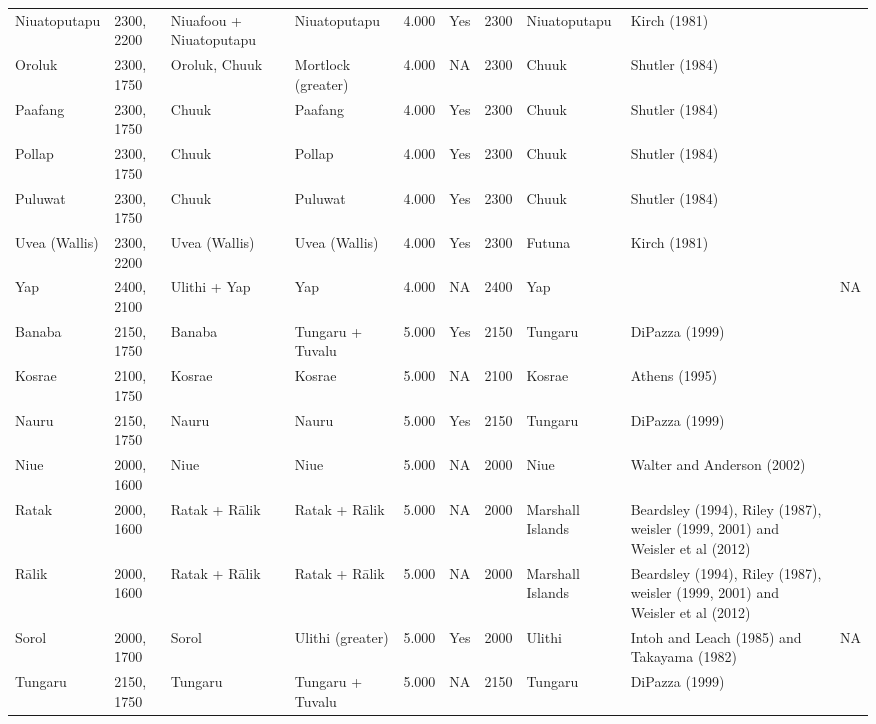 \begin{longtable}{p{4.5cm}p{2cm}p{2cm}p{2cm}p{4cm}p{4cm}p{4cm}p{4cm}p{4cm}p{4cm}}
  Niuatoputapu & 2300, 2200 & Niuafoou + Niuatoputapu & Niuatoputapu & 4.000 & Yes & 2300 & Niuatoputapu & Kirch (1981) & \citet{rieth_cochrane_2018} \\ 
  Oroluk & 2300, 1750 & Oroluk, Chuuk & Mortlock (greater) & 4.000 & NA & 2300 & Chuuk & Shutler (1984) & \citet{rieth_cochrane_2018} \\ 
  Paafang & 2300, 1750 & Chuuk & Paafang & 4.000 & Yes & 2300 & Chuuk & Shutler (1984) & \citet{rieth_cochrane_2018} \\ 
  Pollap & 2300, 1750 & Chuuk & Pollap & 4.000 & Yes & 2300 & Chuuk & Shutler (1984) & \citet{rieth_cochrane_2018} \\ 
  Puluwat & 2300, 1750 & Chuuk & Puluwat & 4.000 & Yes & 2300 & Chuuk & Shutler (1984) & \citet{rieth_cochrane_2018} \\ 
  Uvea (Wallis) & 2300, 2200 & Uvea (Wallis) & Uvea (Wallis) & 4.000 & Yes & 2300 & Futuna & Kirch (1981) & \citet{rieth_cochrane_2018} \\ 
  Yap & 2400, 2100 & Ulithi + Yap & Yap & 4.000 & NA & 2400 & Yap & \citet{Napolitano_et_al_yap} & NA \\ 
  Banaba & 2150, 1750 & Banaba & Tungaru + Tuvalu & 5.000 & Yes & 2150 & Tungaru & DiPazza (1999) & \citet{rieth_cochrane_2018} \\ 
  Kosrae & 2100, 1750 & Kosrae & Kosrae & 5.000 & NA & 2100 & Kosrae & Athens (1995) & \citet{rieth_cochrane_2018} \\ 
  Nauru & 2150, 1750 & Nauru & Nauru & 5.000 & Yes & 2150 & Tungaru & DiPazza (1999) & \citet{rieth_cochrane_2018} \\ 
  Niue & 2000, 1600 & Niue & Niue & 5.000 & NA & 2000 & Niue & Walter and Anderson (2002) & \citet{rieth_cochrane_2018} \\ 
  Ratak & 2000, 1600 & Ratak + Rālik & Ratak + Rālik & 5.000 & NA & 2000 & Marshall Islands & Beardsley (1994), Riley (1987), weisler (1999, 2001) and Weisler et al (2012) & \citet{rieth_cochrane_2018} \\ 
  Rālik & 2000, 1600 & Ratak + Rālik & Ratak + Rālik & 5.000 & NA & 2000 & Marshall Islands & Beardsley (1994), Riley (1987), weisler (1999, 2001) and Weisler et al (2012) & \citet{rieth_cochrane_2018} \\ 
  Sorol & 2000, 1700 & Sorol & Ulithi (greater) & 5.000 & Yes & 2000 & Ulithi & Intoh and Leach (1985) and Takayama (1982) & NA \\ 
  Tungaru & 2150, 1750 & Tungaru & Tungaru + Tuvalu & 5.000 & NA & 2150 & Tungaru & DiPazza (1999) & \citet{rieth_cochrane_2018} \\ 

\end{longtable}
